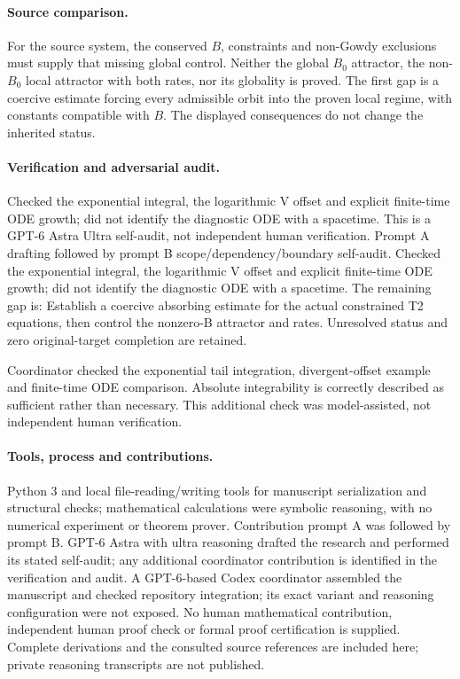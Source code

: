 \documentclass[11pt]{article}
\begin{document}
\paragraph{Source comparison.} For the source system, the conserved \(B\), constraints and non-Gowdy exclusions must supply that missing global control. Neither the global \(B_0\) attractor, the non-\(B_0\) local attractor with both rates, nor its globality is proved. The first gap is a coercive estimate forcing every admissible orbit into the proven local regime, with constants compatible with \(B\). The displayed consequences do not change the inherited status.

\paragraph{Verification and adversarial audit.}
Checked the exponential integral, the logarithmic V offset and explicit finite-time ODE growth; did not identify the diagnostic ODE with a spacetime. This is a GPT-6 Astra Ultra self-audit, not independent human verification. Prompt A drafting followed by prompt B scope/dependency/boundary self-audit. Checked the exponential integral, the logarithmic V offset and explicit finite-time ODE growth; did not identify the diagnostic ODE with a spacetime. The remaining gap is: Establish a coercive absorbing estimate for the actual constrained T2 equations, then control the nonzero-B attractor and rates. Unresolved status and zero original-target completion are retained.

Coordinator checked the exponential tail integration, divergent-offset example and finite-time ODE comparison. Absolute integrability is correctly described as sufficient rather than necessary. This additional check was model-assisted, not independent human verification.

\paragraph{Tools, process and contributions.}
Python 3 and local file-reading/writing tools for manuscript serialization and structural checks; mathematical calculations were symbolic reasoning, with no numerical experiment or theorem prover. Contribution prompt A was followed by prompt B. GPT-6 Astra with ultra reasoning drafted the research and performed its stated self-audit; any additional coordinator contribution is identified in the verification and audit. A GPT-6-based Codex coordinator assembled the manuscript and checked repository integration; its exact variant and reasoning configuration were not exposed. No human mathematical contribution, independent human proof check or formal proof certification is supplied. Complete derivations and the consulted source references are included here; private reasoning transcripts are not published.
\end{document}
